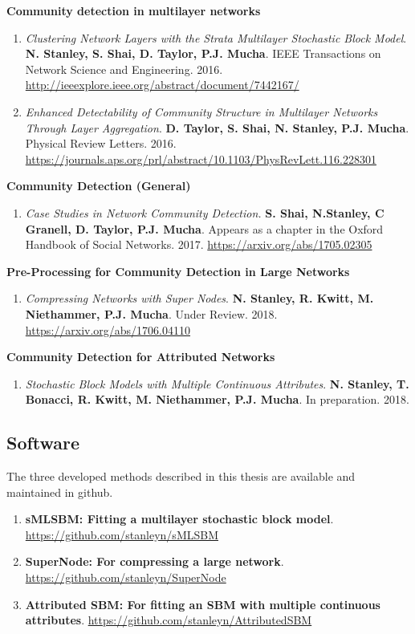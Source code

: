 {\bf Community detection in multilayer networks}
\begin{enumerate}
\item \emph{Clustering Network Layers with the Strata Multilayer Stochastic Block Model}. {\bf N. Stanley, S. Shai, D. Taylor, P.J. Mucha}. IEEE Transactions on Network Science and Engineering. 2016. \url{http://ieeexplore.ieee.org/abstract/document/7442167/}
\item \emph{Enhanced Detectability of Community Structure in Multilayer Networks Through Layer Aggregation}. {\bf D. Taylor, S. Shai, N. Stanley, P.J. Mucha}. Physical Review Letters. 2016. \url{https://journals.aps.org/prl/abstract/10.1103/PhysRevLett.116.228301}
\end{enumerate}

{\bf Community Detection (General)}
\begin{enumerate}
\item \emph{Case Studies in Network Community Detection.} {\bf S. Shai, N.Stanley, C Granell, D. Taylor, P.J. Mucha}. Appears as a chapter in the Oxford Handbook of Social Networks. 2017. \url{https://arxiv.org/abs/1705.02305}
\end{enumerate}

{\bf Pre-Processing for Community Detection in Large Networks}
\begin{enumerate}
\item \emph{Compressing Networks with Super Nodes}. {\bf N. Stanley, R. Kwitt, M. Niethammer, P.J. Mucha}. Under Review. 2018. \url{https://arxiv.org/abs/1706.04110}
\end{enumerate}

 {\bf Community Detection for Attributed Networks}
 \begin{enumerate}
 \item \emph{Stochastic Block Models with Multiple Continuous Attributes}. {\bf N. Stanley, T. Bonacci, R. Kwitt, M. Niethammer, P.J. Mucha}. In preparation. 2018. 
 \end{enumerate}
 
 \subsection{Software}
 The three developed methods described in this thesis are available and maintained in github. 
 
 \begin{enumerate}
 \item {\bf sMLSBM: Fitting a multilayer stochastic block model}. \url{https://github.com/stanleyn/sMLSBM}
 \item {\bf SuperNode: For compressing a large network}. \url{https://github.com/stanleyn/SuperNode}
 \item {\bf Attributed SBM: For fitting an SBM with multiple continuous attributes}. \url{https://github.com/stanleyn/AttributedSBM}
 \end{enumerate}
 
